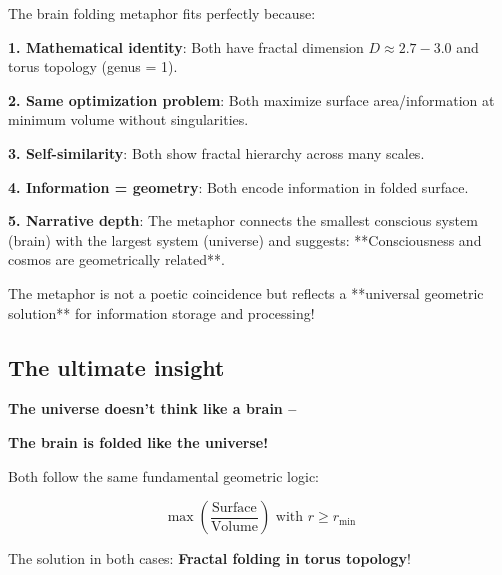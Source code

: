 	\begin{keyresult}
		The brain folding metaphor fits perfectly because:
		
		\vspace{0.3cm}
		
		\textbf{1. Mathematical identity}:
		Both have fractal dimension $D \approx 2.7 - 3.0$ and torus topology (genus = 1).
		
		\vspace{0.3cm}
		
		\textbf{2. Same optimization problem}:
		Both maximize surface area/information at minimum volume without singularities.
		
		\vspace{0.3cm}
		
		\textbf{3. Self-similarity}:
		Both show fractal hierarchy across many scales.
		
		\vspace{0.3cm}
		
		\textbf{4. Information = geometry}:
		Both encode information in folded surface.
		
		\vspace{0.3cm}
		
		\textbf{5. Narrative depth}:
		The metaphor connects the smallest conscious system (brain) with the largest system (universe) and suggests: **Consciousness and cosmos are geometrically related**.
		
		\vspace{0.3cm}
		
		The metaphor is not a poetic coincidence but reflects a **universal geometric solution** for information storage and processing!
	\end{keyresult}
	
	\subsection{The ultimate insight}
	
	\begin{revolutionary}[The deepest truth]
		
		\begin{center}
			\textbf{The universe doesn't think like a brain --}
			
			\vspace{0.3cm}
			
			\textbf{The brain is folded like the universe!}
		\end{center}
		
		\normalsize
		
		\vspace{0.3cm}
		
		Both follow the same fundamental geometric logic:
		
		\begin{equation}
			\boxed{\max\left(\frac{\text{Surface}}{\text{Volume}}\right) \text{ with } r \geq r_{\min}}
		\end{equation}
		
		The solution in both cases: \textbf{Fractal folding in torus topology}!
	\end{revolutionary}
	